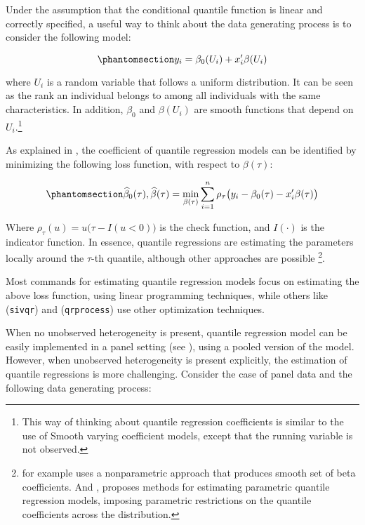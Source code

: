 \documentclass[bib]{statapress}
\begin{document}
Under the assumption that the conditional quantile function is linear
and correctly specified, a useful way to think about the data generating
process is to consider the following model:

\begin{equation}\phantomsection\label{eq-dgp}{y_i = \beta_0(U_i)+x_i'\beta(U_i) 
}\end{equation}

where \(U_i\) is a random variable that follows a uniform distribution.
It can be seen as the rank an individual belongs to among all
individuals with the same characteristics. In addition, \(\beta_0\) and
\(\beta(U_i)\) are smooth functions that depend on \(U_i\).\footnote{This
  way of thinking about quantile regression coefficients is similar to
  the use of Smooth varying coefficient models, except that the running
  variable is not observed.}

As explained in \citet{wooldridge2010}, the coefficient of quantile
regression models can be identified by minimizing the following loss
function, with respect to \(\beta(\tau)\):

\begin{equation}\phantomsection\label{eq-qloss}{
\hat\beta_0(\tau),\hat\beta(\tau) = \min_{\beta(\tau)} \sum_{i=1}^{n} \rho_\tau \big(y_i-\beta_0(\tau)-x_i'\beta(\tau)\big)
}\end{equation}

Where \(\rho_\tau(u)=u\big(\tau-I(u<0)\big)\) is the check function, and
\(I(\cdot)\) is the indicator function. In essence, quantile regressions
are estimating the parameters locally around the \(\tau\)-th quantile,
although other approaches are possible \footnote{\citet{kaplan2017} for
  example uses a nonparametric approach that produces smooth set of beta
  coefficients. And \citet{bottai2019}, proposes methods for estimating
  parametric quantile regression models, imposing parametric
  restrictions on the quantile coefficients across the distribution.}.

Most commands for estimating quantile regression models focus on
estimating the above loss function, using linear programming techniques,
while others like \citet{kaplan2017} (\texttt{sivqr}) and
\citet{chernozhukov2022} (\texttt{qrprocess}) use other optimization
techniques.

When no unobserved heterogeneity is present, quantile regression model
can be easily implemented in a panel setting (see
\citet{wooldridge2010}), using a pooled version of the model. However,
when unobserved heterogeneity is present explicitly, the estimation of
quantile regressions is more challenging. Consider the case of panel
data and the following data generating process:
\end{document}
